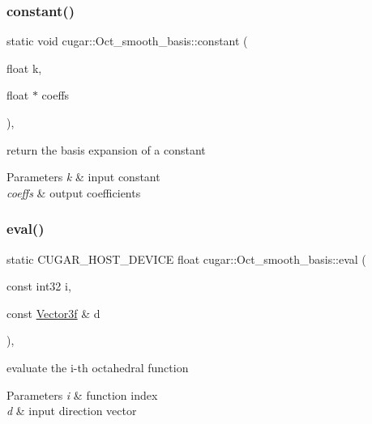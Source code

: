 \subsubsection{\texorpdfstring{constant()}{constant()}}
{\footnotesize\ttfamily static void cugar\+::\+Oct\+\_\+smooth\+\_\+basis\+::constant (\begin{DoxyParamCaption}\item[{float}]{k,  }\item[{float $\ast$}]{coeffs }\end{DoxyParamCaption})\hspace{0.3cm}{\ttfamily [inline]}, {\ttfamily [static]}}

return the basis expansion of a constant


\begin{DoxyParams}{Parameters}
{\em k} & input constant \\
\hline
{\em coeffs} & output coefficients \\
\hline
\end{DoxyParams}
\mbox{\label{structcugar_1_1_oct__smooth__basis_a310ec19b1ced8812b5fe4f415a721773}} 
\subsubsection{\texorpdfstring{eval()}{eval()}}
{\footnotesize\ttfamily static C\+U\+G\+A\+R\+\_\+\+H\+O\+S\+T\+\_\+\+D\+E\+V\+I\+CE float cugar\+::\+Oct\+\_\+smooth\+\_\+basis\+::eval (\begin{DoxyParamCaption}\item[{const int32}]{i,  }\item[{const \hyperlink{structcugar_1_1_vector}{Vector3f} \&}]{d }\end{DoxyParamCaption})\hspace{0.3cm}{\ttfamily [inline]}, {\ttfamily [static]}}

evaluate the i-\/th octahedral function


\begin{DoxyParams}{Parameters}
{\em i} & function index \\
\hline
{\em d} & input direction vector \\
\hline
\end{DoxyParams}
\mbox{\label{structcugar_1_1_oct__smooth__basis_ac7edf7dee897a7a8b6fc204f83c90a70}} 
